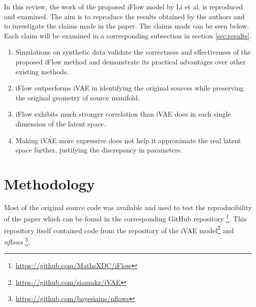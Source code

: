In this review, the work of the proposed iFlow model by Li et al. \cite{li2019identifying} is reproduced and examined. The aim is to reproduce the results obtained by the authors and to investigate the claims made in the paper. The claims made can be seen below. Each claim will be examined in a corresponding subsection in section \ref{sec:results}.

\begin{enumerate}
    \item Simulations on synthetic data validate the correctness and effectiveness of the proposed iFlow method and demonstrate its practical advantages over other existing methods.
    \item iFlow outperforms iVAE in identifying the original sources while preserving the original geometry of source manifold.
    \item iFlow exhibits much stronger correlation than iVAE does in each single dimension of the latent space.
    \item Making iVAE more expressive does not help it approximate the real latent space further, justifying the discrepancy in parameters.
\end{enumerate}

\section{Methodology}
\label{sec:methodology}
Most of the original source code was available and used to test the reproducibility of the paper which can be found in the corresponding GitHub repository \footnote{\url{https://github.com/MathsXDC/iFlow}}. This repository itself contained code from the repository of the iVAE model\footnote{\url{https://github.com/siamakz/iVAE}} and \textit{nflows} \footnote{\url{https://github.com/bayesiains/nflows}}.

